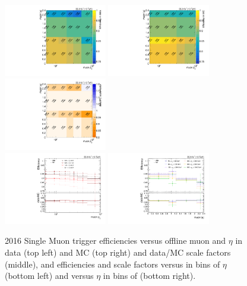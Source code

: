 \begin{figure}[htbp]
  \centering
  \includegraphics[width=0.4\textwidth]{fig/eventSelection/TriggerEff_MU_DATA_abseta_2016.pdf}
  \includegraphics[width=0.4\textwidth]{fig/eventSelection/TriggerEff_MU_MC_abseta_2016.pdf}\\
  \includegraphics[width=0.4\textwidth]{fig/eventSelection/TriggerSF_MU_2016.pdf}\\
  \includegraphics[width=0.4\textwidth]{fig/eventSelection/TriggerEff1DPt_MU2016.pdf}
  \includegraphics[width=0.4\textwidth]{fig/eventSelection/TriggerEff1DAbsEta_MU2016.pdf}\\
  \caption{
    2016 Single Muon trigger efficiencies versus offline muon \pt and $\eta$ in data (top left) and MC (top right) and data/MC scale factors (middle), and efficiencies and scale factors versus \pt in bins of $\eta$ (bottom left) and versus $\eta$ in bins of \pt (bottom right).
  }
  \label{fig:mutrigeff2016}
\end{figure}

